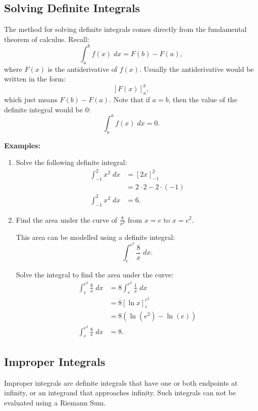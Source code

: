 \subsection{Solving Definite Integrals}
The method for solving definite integrals comes directly from the fundamental theorem of calculus. Recall:
\[ \int_a^b f(x) \; dx = F(b) - F(a), \]
where $F(x)$ is the antiderivative of $f(x)$. Usually the antiderivative would be written in the form:
\[ [F(x)]_a^b, \]
which just means $F(b) - F(a)$. Note that if $a = b$, then the value of the definite integral would be $0$:
\[ \int_a^a f(x) \; dx = 0. \]

\noindent \textbf{Examples:}
\begin{enumerate}
	\item Solve the following definite integral:
	\begin{align*}
		\int_{-1}^2 x^2 \; dx &= [2x]_{-1}^2 \\[5pt]
		&= 2 \cdot 2 - 2 \cdot (-1) \\
		\int_{-1}^2 x^2 \; dx &= 6.
	\end{align*}

	\item Find the area under the curve of $\frac{8}{x^2}$ from $x = e$ to $x = e^2$.

	This area can be modelled using a definite integral:
	\[ \int_e^{e^2} \frac{8}{x} \; dx. \]

	Solve the integral to find the area under the curve:
	\begin{align*}
		\int_e^{e^2} \frac{8}{x} \; dx &= 8 \int_e^{e^2} \frac{1}{x} \; dx \\[5pt]
		&= 8 [\ln x]_e^{e^2} \\
		&= 8 (\ln (e^2) - \ln (e)) \\
		\int_e^{e^2} \frac{8}{x} \; dx &= 8.
	\end{align*}
\end{enumerate}

\subsection{Improper Integrals}
Improper integrals are definite integrals that have one or both endpoints at infinity, or an integrand that approaches infinity. Such integrals can not be evaluated using a Riemann Sum.

